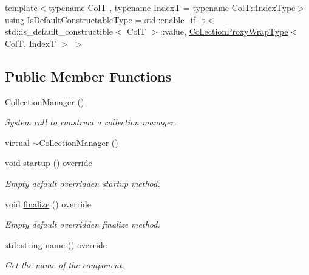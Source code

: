 \begin{DoxyCompactItemize}
\item 
{\footnotesize template$<$typename ColT , typename IndexT  = typename Col\+T\+::\+Index\+Type$>$ }\\using \hyperlink{structvt_1_1vrt_1_1collection_1_1_collection_manager_af8091fcb8218dad155ea028c9b5d283f}{Is\+Default\+Constructable\+Type} = std\+::enable\+\_\+if\+\_\+t$<$ std\+::is\+\_\+default\+\_\+constructible$<$ ColT $>$\+::value, \hyperlink{structvt_1_1vrt_1_1collection_1_1_collection_manager_a56458ed7f9bb22b631b9b3a745f42f94}{Collection\+Proxy\+Wrap\+Type}$<$ ColT, IndexT $>$ $>$
\end{DoxyCompactItemize}
\subsection*{Public Member Functions}
\begin{DoxyCompactItemize}
\item 
\hyperlink{structvt_1_1vrt_1_1collection_1_1_collection_manager_ad6c6c75f1f54ae5470847311256ae8c3}{Collection\+Manager} ()
\begin{DoxyCompactList}\small\item\em System call to construct a collection manager. \end{DoxyCompactList}\item 
virtual \hyperlink{structvt_1_1vrt_1_1collection_1_1_collection_manager_aea0c10371b37041bcc855eef0c767b85}{$\sim$\+Collection\+Manager} ()
\item 
void \hyperlink{structvt_1_1vrt_1_1collection_1_1_collection_manager_ac71095016a20dd9607f2f937bf35305e}{startup} () override
\begin{DoxyCompactList}\small\item\em Empty default overridden startup method. \end{DoxyCompactList}\item 
void \hyperlink{structvt_1_1vrt_1_1collection_1_1_collection_manager_afafcdbf36f42835471218b654252031c}{finalize} () override
\begin{DoxyCompactList}\small\item\em Empty default overridden finalize method. \end{DoxyCompactList}\item 
std\+::string \hyperlink{structvt_1_1vrt_1_1collection_1_1_collection_manager_af7cc4c83ae2792595eee99a3206ed633}{name} () override
\begin{DoxyCompactList}\small\item\em Get the name of the component. \end{DoxyCompactList}\item 

\end{DoxyCompactItemize}
